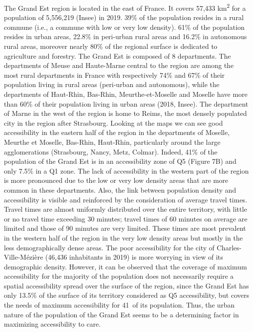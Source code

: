 The Grand Est region is located in the east of France. It covers 57,433
km\textsuperscript{2} for a population of 5,556,219 (Insee) in 2019. 39\% of the
population resides in a rural commune (i.e., a commune with low or very low
density). 61\% of the population resides in urban areas, 22.8\% in peri-urban
rural areas and 16.2\% in autonomous rural areas, moreover nearly 80\% of the
regional surface is dedicated to agriculture and forestry. The Grand Est is
composed of 8 departments. The departments of Meuse and Haute-Marne central to
the region are among the most rural departments in France with respectively 74\%
and 67\% of their population living in rural areas (peri-urban and autonomous),
while the departments of Haut-Rhin, Bas-Rhin, Meurthe-et-Moselle and Moselle
have more than 60\% of their population living in urban areas (2018, Insee). The
department of Marne in the west of the region is home to Reims, the most densely
populated city in the region after Strasbourg. Looking at the maps we can see
good accessibility in the eastern half of the region in the departments of
Moselle, Meurthe et Moselle, Bas-Rhin, Haut-Rhin, particularly around the large
agglomerations (Strasbourg, Nancy, Metz, Colmar). Indeed, 41\% of the population
of the Grand Est is in an accessibility zone of Q5 (Figure 7B) and only 7.5\% in
a Q1 zone. The lack of accessibility in the western part of the region is more
pronounced due to the low or very low density areas that are more common in
these departments. Also, the link between population density and accessibility
is visible and reinforced by the consideration of average travel times. Travel
times are almost uniformly distributed over the entire territory, with little or
no travel time exceeding 30 minutes; travel times of 60 minutes on average are
limited and those of 90 minutes are very limited. These times are most prevalent
in the western half of the region in the very low density areas but mostly in
the less demographically dense areas.  The poor accessibility for the city of
Charles-Ville-Mézière (46,436 inhabitants in 2019) is more worrying in view of
its demographic density. However, it can be observed that the coverage of
maximum accessibility for the majority of the population does not necessarily
require a spatial accessibility spread over the surface of the region, since the
Grand Est has only 13.5\% of the surface of its territory considered as Q5
accessibility, but covers the needs of maximum accessibility for 41\ of its
population. Thus, the urban nature of the population of the Grand Est seems to
be a determining factor in maximizing accessibility to care.

